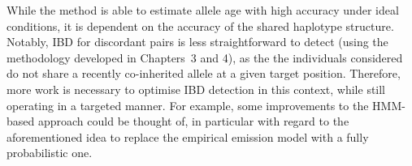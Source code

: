 While the method is able to estimate allele age with high accuracy under ideal conditions, it is dependent on the accuracy of the shared haplotype structure.
Notably, IBD for discordant pairs is less straightforward to detect (using the methodology developed in Chapters~3 and 4), as the the  individuals considered do not share a recently co-inherited allele at a given target position.
Therefore, more work is necessary to optimise IBD detection in this context, while still operating in a targeted manner.
For example, some improvements to the HMM-based approach could be thought of, in particular with regard to the aforementioned idea to replace the empirical emission model with a fully probabilistic one.

%
%
%
%
%
%
%
%

